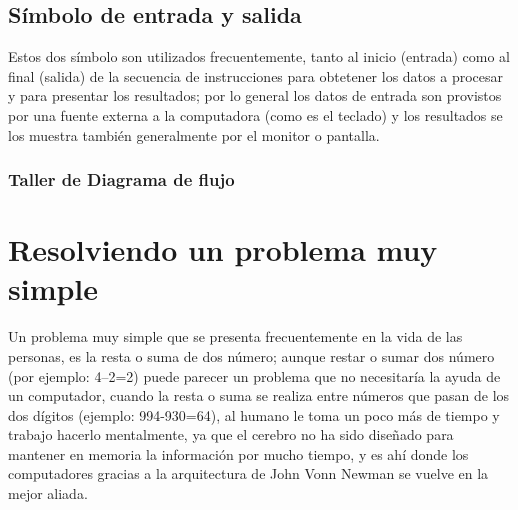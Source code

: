 \documentclass[a4paper,12pt,spanish]{article}
\begin{document}
\subsection{Símbolo de entrada y salida}
\label{sec:simbolo-de-entrada}

Estos dos símbolo son utilizados frecuentemente, tanto al inicio (entrada) como al
final (salida) de la secuencia de instrucciones para obtetener los datos a procesar y para presentar los resultados; por lo general los datos de entrada son provistos por una fuente externa a la computadora (como es el teclado) y los resultados se los muestra también generalmente por el monitor o pantalla.

\begin{center}
\end{center}




\subsubsection{Taller de Diagrama de flujo}
\label{sec:taller-de-diagrama}

\section{Resolviendo un problema muy simple}
\label{sec:resolv-un-probl}

Un problema muy simple que se presenta frecuentemente  en la vida de
las personas, es la resta o suma de dos número;  aunque restar o sumar dos
número (por ejemplo:  4--2=2) puede parecer un problema que no necesitaría la ayuda de un computador, cuando la resta o suma se realiza entre números que pasan de los dos dígitos (ejemplo: 994-930=64), al humano le toma un poco más de tiempo y trabajo hacerlo mentalmente, ya que el cerebro no ha sido diseñado para mantener en memoria la
información por mucho tiempo, y es ahí donde los computadores gracias
a la arquitectura de John Vonn Newman se vuelve en la mejor aliada.
\end{document}
